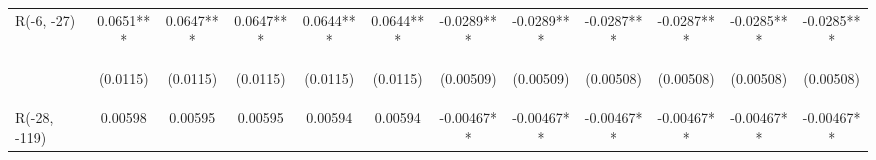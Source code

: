 \documentclass[]{article}
\begin{document}
\begin{center}
\begin{tabular}{lccccccccccc}
R(-6, -27) & 0.0651*** & 0.0647*** & 0.0647*** & 0.0644*** & 0.0644*** & -0.0289*** & -0.0289*** & -0.0287*** & -0.0287*** & -0.0285*** & -0.0285*** \\
\vspace{4pt} & \begin{footnotesize}(0.0115)\end{footnotesize} & \begin{footnotesize}(0.0115)\end{footnotesize} & \begin{footnotesize}(0.0115)\end{footnotesize} & \begin{footnotesize}(0.0115)\end{footnotesize} & \begin{footnotesize}(0.0115)\end{footnotesize} & \begin{footnotesize}(0.00509)\end{footnotesize} & \begin{footnotesize}(0.00509)\end{footnotesize} & \begin{footnotesize}(0.00508)\end{footnotesize} & \begin{footnotesize}(0.00508)\end{footnotesize} & \begin{footnotesize}(0.00508)\end{footnotesize} & \begin{footnotesize}(0.00508)\end{footnotesize} \\
R(-28, -119) & 0.00598 & 0.00595 & 0.00595 & 0.00594 & 0.00594 & -0.00467** & -0.00467** & -0.00467** & -0.00467** & -0.00467** & -0.00467** \\

\end{tabular}
\end{center}
\end{document}
